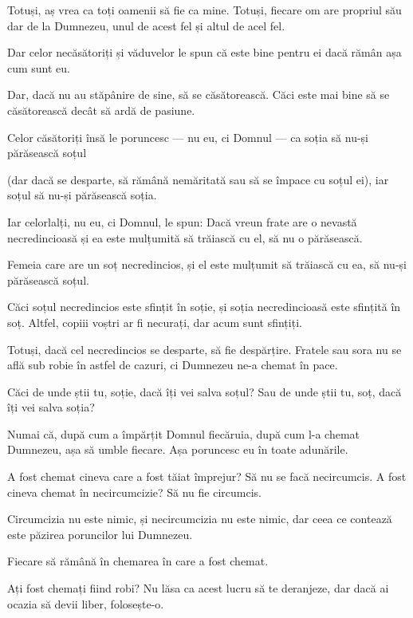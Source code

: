 {Totuși, aș vrea ca toți oamenii să fie ca mine. Totuși, fiecare om are propriul său dar de la Dumnezeu, unul de acest fel și altul de acel fel.

Dar celor necăsătoriți și văduvelor le spun că este bine pentru ei dacă rămân așa cum sunt eu.

Dar, dacă nu au stăpânire de sine, să se căsătorească. Căci este mai bine să se căsătorească decât să ardă de pasiune.

Celor căsătoriți însă le poruncesc — nu eu, ci Domnul — ca soția să nu-și părăsească soțul

(dar dacă se desparte, să rămână nemăritată sau să se împace cu soțul ei), iar soțul să nu-și părăsească soția.


\par }{\PP {}Iar celorlalți, nu eu, ci Domnul, le spun: Dacă vreun frate are o nevastă necredincioasă și ea este mulțumită să trăiască cu el, să nu o părăsească.

Femeia care are un soț necredincios, și el este mulțumit să trăiască cu ea, să nu-și părăsească soțul.

Căci soțul necredincios este sfințit în soție, și soția necredincioasă este sfințită în soț. Altfel, copiii voștri ar fi necurați, dar acum sunt sfințiți.

Totuși, dacă cel necredincios se desparte, să fie despărțire. Fratele sau sora nu se află sub robie în astfel de cazuri, ci Dumnezeu ne-a chemat în pace.

Căci de unde știi tu, soție, dacă îți vei salva soțul? Sau de unde știi tu, soț, dacă îți vei salva soția?


\par }{\PP {}Numai că, după cum a împărțit Domnul fiecăruia, după cum l-a chemat Dumnezeu, așa să umble fiecare. Așa poruncesc eu în toate adunările.


\par }{\PP {}A fost chemat cineva care a fost tăiat împrejur? Să nu se facă necircumcis. A fost cineva chemat în necircumcizie? Să nu fie circumcis.

Circumcizia nu este nimic, și necircumcizia nu este nimic, dar ceea ce contează este păzirea poruncilor lui Dumnezeu.

Fiecare să rămână în chemarea în care a fost chemat.

Ați fost chemați fiind robi? Nu lăsa ca acest lucru să te deranjeze, dar dacă ai ocazia să devii liber, folosește-o.

}
